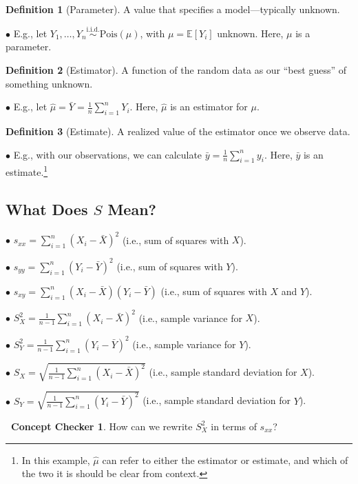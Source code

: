 \documentclass[12pt,oneside]{article}
\newcommand{\E}{\mathbb{E}}
\newcommand{\Pois}{\text{Pois}}
\newcommand{\simiid}{\overset{\text{i.i.d.}}{\sim}}
\theoremstyle{definition}
\newtheorem{definition}{Definition}
\newtheorem{concept}{\faPen \ Concept Checker}
\theoremstyle{remark}
\begin{document}
\begin{definition}[Parameter]
A value that specifies a model—typically unknown.

$\bullet$ E.g., let $Y_1, \ldots, Y_n \simiid \Pois(\mu)$, with $\mu = \E[Y_i]$ unknown. Here, $\mu$ is a parameter.
\end{definition}

\begin{definition}[Estimator]
A function of the random data as our \enquote{best guess} of something unknown.

$\bullet$ E.g., let $\hat{\mu} = \bar{Y} = \frac{1}{n} \sum_{i = 1}^{n} Y_i$. Here, $\hat{\mu}$ is an estimator for $\mu$.
\end{definition}

\begin{definition}[Estimate]
A realized value of the estimator once we observe data.

$\bullet$ E.g., with our observations, we can calculate $\bar{y} = \frac{1}{n} \sum_{i = 1}^{n} y_i$. Here, $\bar{y}$ is an estimate.\footnote{In this example, $\hat{\mu}$ can refer to either the estimator or estimate, and which of the two it is should be clear from context.}
\end{definition}

\subsection{What Does $S$ Mean?}

$\bullet$ $s_{xx} = \sum^{n}_{i = 1} (X_i - \bar{X})^2$ (i.e., sum of squares with $X$).

$\bullet$ $s_{yy} = \sum^{n}_{i = 1} (Y_i - \bar{Y})^2$ (i.e., sum of squares with $Y$).

$\bullet$ $s_{xy} = \sum^{n}_{i = 1} (X_i - \bar{X}) (Y_i - \bar{Y})$ (i.e., sum of squares with $X$ and $Y$).

$\bullet$ $S^2_{X} = \frac{1}{n - 1} \sum^{n}_{i = 1} (X_i - \bar{X})^2$ (i.e., sample variance for $X$).

$\bullet$ $S^2_{Y} = \frac{1}{n - 1} \sum^{n}_{i = 1} (Y_i - \bar{Y})^2$ (i.e., sample variance for $Y$).

$\bullet$ $S_{X} = \sqrt{\frac{1}{n - 1} \sum^{n}_{i = 1} (X_i - \bar{X})^2}$ (i.e., sample standard deviation for $X$).

$\bullet$ $S_{Y} = \sqrt{\frac{1}{n - 1} \sum^{n}_{i = 1} (Y_i - \bar{Y})^2}$ (i.e., sample standard deviation for $Y$).

\begin{concept}
How can we rewrite $S^{2}_{X}$ in terms of $s_{xx}$?
\end{concept}
\end{document}
